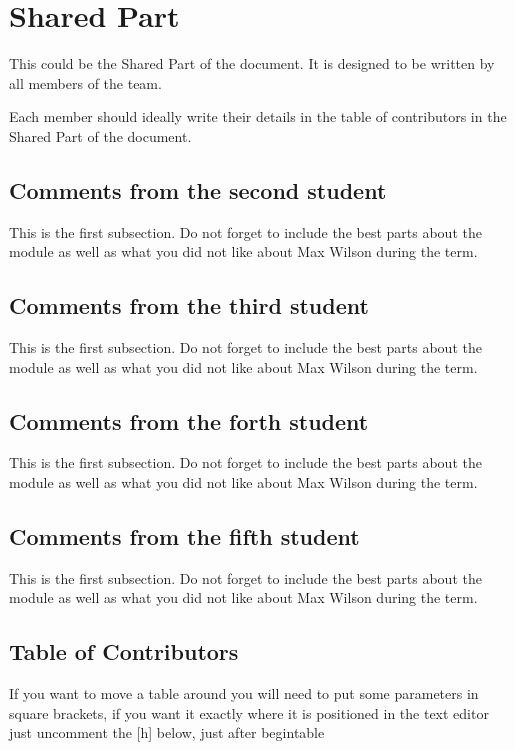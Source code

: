 \section{Shared Part}

This could be the Shared Part of the document. It is designed to be written by all members of the team.

Each member should ideally write their details in the table of contributors in the Shared Part of the document.



\subsection{Comments from the second student}
This is the first subsection. Do not forget to include the best parts about the module as well as what you did not like about Max Wilson during the term.

\subsection{Comments from the third student}
This is the first subsection. Do not forget to include the best parts about the module as well as what you did not like about Max Wilson during the term.

\subsection{Comments from the forth student}
This is the first subsection. Do not forget to include the best parts about the module as well as what you did not like about Max Wilson during the term.

\subsection{Comments from the fifth student}
This is the first subsection. Do not forget to include the best parts about the module as well as what you did not like about Max Wilson during the term.

\subsection{Table of Contributors}


If you want to move a table around you will need to put some parameters in square brackets, if you want it exactly where it is positioned in the text editor just uncomment the [h] below, just after begin{table}

